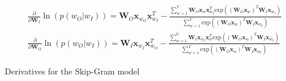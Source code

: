 \begin{equationbox}[H]
\begin{equation*}
\begin{aligned}
\frac{\partial}{\partial \mathbf{W}_I} \ln( p(w_O | w_I) ) = \mathbf{W}_O \mathbf{x}_{w_O} \mathbf{x}_{w_I}^T - \frac{
	\sum_{w=1}^V \mathbf{W}_O \mathbf{x}_{w} \mathbf{x}_{w_I}^T \mathrm{exp}( \left( \mathbf{W}_O \mathbf{x}_{w} \right)^T \mathbf{W}_I \mathbf{x}_{w_I})
} {
	\sum_{w=1}^V \mathrm{exp}( \left( \mathbf{W}_O \mathbf{x}_{w} \right)^T \mathbf{W}_I \mathbf{x}_{w_I})
} \\
\frac{\partial}{\partial \mathbf{W}_O} \ln( p(w_O | w_I) ) = \mathbf{W}_I \mathbf{x}_{w_I} \mathbf{x}_{w_O}^T - \frac{
	\sum_{w=1}^V \mathbf{W}_I \mathbf{x}_{w_I} \mathbf{x}_{w}^T \mathrm{exp}( \left( \mathbf{W}_O \mathbf{x}_{w} \right)^T \mathbf{W}_I \mathbf{x}_{w_I})
} {
	\sum_{w=1}^V \mathrm{exp}( \left( \mathbf{W}_O \mathbf{x}_{w} \right)^T \mathbf{W}_I \mathbf{x}_{w_I})
}
\end{aligned}
\end{equation*}
\caption{Derivatives for the Skip-Gram model}
\end{equationbox}

